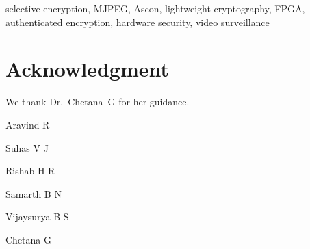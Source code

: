 \documentclass{ieeeaccess}
\theoremstyle{definition}\newtheorem{definition}{Definition}
\begin{document}
\begin{keywords}
selective encryption, MJPEG, Ascon, lightweight cryptography, FPGA, authenticated encryption, hardware security, video surveillance
\end{keywords}

\titlepgskip=-21pt
\maketitle














\section*{Acknowledgment}
We thank Dr.~Chetana~G for her guidance. 




\begin{IEEEbiographynophoto}{Aravind R}
\end{IEEEbiographynophoto}
\begin{IEEEbiographynophoto}{Suhas V J}
\end{IEEEbiographynophoto}
\begin{IEEEbiographynophoto}{Rishab H R}
\end{IEEEbiographynophoto}
\begin{IEEEbiographynophoto}{Samarth B N}
\end{IEEEbiographynophoto}
\begin{IEEEbiographynophoto}{Vijaysurya B S}
\end{IEEEbiographynophoto}
\begin{IEEEbiographynophoto}{Chetana G}
\end{IEEEbiographynophoto}
\EOD
\end{document}
